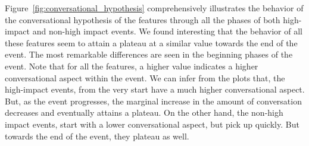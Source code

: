 \documentclass[10pt,letterpaper]{article}
\begin{document}
Figure~\ref{fig:conversational_hypothesis} comprehensively illustrates
the behavior of the conversational hypothesis of the features through
all the phases of both high-impact and non-high impact events. We
found interesting that the behavior of all these features seem to attain a
plateau at a similar value towards the end of the event. The most
remarkable differences are seen in the beginning phases of the event.
Note that for all the features, a higher value indicates a higher
conversational aspect within the event. We can infer from the plots
that, the high-impact events, from the very start have a much higher
conversational aspect. But, as the event progresses, the marginal
increase in the amount of conversation decreases and eventually
attains a plateau. On the other hand, the non-high impact events,
start with a lower conversational aspect, but pick up quickly. But
towards the end of the event, they plateau as well.
\end{document}
